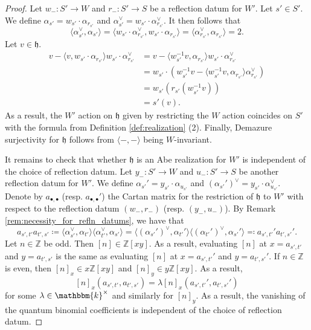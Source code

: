 \documentclass{amsart}
\newcommand{\Z}{\mathbb{Z}}
\renewcommand{\k}{\mathbbm{k}}
\newcommand{\fr}[1]{\mathfrak{#1}}
\theoremstyle{definition}
\numberwithin{equation}{subsection}
\begin{document}
\begin{proof}
    Let $w_{-} : S' \to W$ and $r_{-} : S' \to S$ be a reflection datum for $W'$. Let $s' \in S'$. 
    We define $\alpha_{s'} = w_{s'} \cdot \alpha_{r_{s'}}$ and $\alpha_{s'}^{\vee} = w_{s'} \cdot \alpha_{r_{s'}}^{\vee}$.
    It then follows that 
    \[ \langle \alpha_{s'}^{\vee}, \alpha_{s'} \rangle = \langle w_{s'} \cdot \alpha_{r_{s'}}^{\vee},  w_{s'} \cdot \alpha_{r_{s'}} \rangle = \langle \alpha_{r_{s'}}^{\vee}, \alpha_{r_{s'}} \rangle =  2.\]
    Let $v \in \fr{h}$.
    \begin{align*}
        v - \langle v, w_{s'} \cdot \alpha_{r_{s'}} \rangle w_{s'} \cdot \alpha_{r_{s'}}^{\vee} &= v - \langle w_{s'}^{-1} v, \alpha_{r_{s'}} \rangle w_{s'} \cdot \alpha_{r_{s'}}^{\vee} \\
        &= w_{s'} \cdot \left( w_{s'}^{-1} v - \langle w_{s'}^{-1} v, \alpha_{r_{s'}} \rangle \alpha_{r_{s'}}^{\vee} \right) \\
        &= w_{s'} ( r_{s'} (w_{s'}^{-1} v)) \\
        &= s' (v).
    \end{align*}
    As a result, the $W'$ action on $\fr{h}$ given by restricting the $W$ action coincides on $S'$ with the formula from Definition \ref{def:realization} (2). 
    Finally, Demazure surjectivity for $\fr{h}$ follows from $\langle -, - \rangle$ being $W$-invariant. 

    It remains to check that whether $\fr{h}$ is an Abe realization for $W'$ is independent of the choice of reflection datum. 
    Let $y_{-} : S' \to W$ and $u_{-} : S' \to S$ be another reflection datum for $W'$. 
    We define $\alpha_{s'}' = y_{s'} \cdot \alpha_{u_{s'}}$ and $(\alpha_{s'}')^{\vee} = y_{s'} \cdot \alpha_{u_{s'}}^{\vee}$. Denote by $a_{\bullet, \bullet}$ (resp. $a_{\bullet, \bullet}'$) the Cartan matrix for the restriction of $\fr{h}$ to $W'$ with respect to the reflection datum $(w_{-}, r_{-})$ (resp. $(y_{-}, u_{-})$).
    By Remark \ref{rem:necessity_for_refln_datums}, we have that 
    \begin{equation}
        a_{s', t'} a_{t',s'} \coloneq \langle \alpha_{s'}^{\vee}, \alpha_{t'} \rangle \langle \alpha_{t'}^{\vee}, \alpha_{s'} \rangle =  \langle (\alpha_{s'}')^{\vee}, \alpha_{t'}' \rangle \langle (\alpha_{t'}')^{\vee}, \alpha_{s'}' \rangle \eqcolon a_{s',t'}' a_{t',s'}'.
    \end{equation}
    Let $n \in \Z$ be odd. Then $[n] \in \Z [xy]$. As a result, evaluating $[n]$ at $x= a_{s',t'}$ and $y = a_{t',s'}$ is the same as evaluating $[n]$ at $x= a_{s',t'}'$ and $y = a_{t',s'}'$.
    If $n \in \Z$ is even, then $[n]_x \in x\Z[xy]$ and $[n]_y \in y \Z[xy]$.
    As a result, 
    \[[n]_x (a_{s',t'}, a_{t',s'}) = \lambda [n]_x (a_{s',t'}' , a_{t',s'}')\]
    for some $\lambda \in \k^{\times}$ and similarly for $[n]_y$.
    As a result, the vanishing of the quantum binomial coefficients is independent of the choice of reflection datum.
\end{proof}
\end{document}
